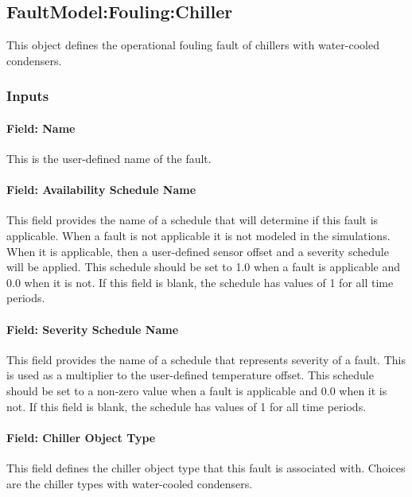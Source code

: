 \subsection{FaultModel:Fouling:Chiller}\label{faultmodelfoulingchiller}

This object defines the operational fouling fault of chillers with water-cooled condensers.

\subsubsection{Inputs}

\paragraph{Field: Name}

This is the user-defined name of the fault.

\paragraph{Field: Availability Schedule Name}

This field provides the name of a schedule that will determine if this fault is applicable. When a fault is not applicable it is not modeled in the simulations. When it is applicable, then a user-defined sensor offset and a severity schedule will be applied. This schedule should be set to 1.0 when a fault is applicable and 0.0 when it is not. If this field is blank, the schedule has values of 1 for all time periods.

\paragraph{Field: Severity Schedule Name}\label{field-severity-schedule-name}

This field provides the name of a schedule that represents severity of a fault. This is used as a multiplier to the user-defined temperature offset. This schedule should be set to a non-zero value when a fault is applicable and 0.0 when it is not. If this field is blank, the schedule has values of 1 for all time periods.

\paragraph{Field: Chiller Object Type}\label{field-chiller-object-type}

This field defines the chiller object type that this fault is associated with. Choices are the chiller types with water-cooled condensers.

